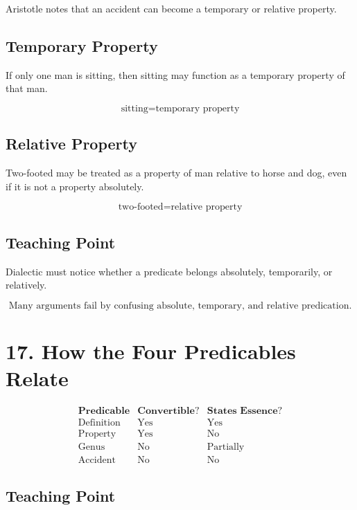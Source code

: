 \documentclass[12pt]{article}
\begin{document}
Aristotle notes that an accident can become a temporary or relative property.

\subsection*{Temporary Property}

If only one man is sitting, then sitting may function as a temporary property of
that man.

\[
\text{sitting} = \text{temporary property}
\]

\subsection*{Relative Property}

Two-footed may be treated as a property of man relative to horse and dog, even
if it is not a property absolutely.

\[
\text{two-footed} = \text{relative property}
\]

\subsection*{Teaching Point}

Dialectic must notice whether a predicate belongs absolutely, temporarily, or
relatively.

\[
\boxed{
\text{Many arguments fail by confusing absolute, temporary, and relative predication.}
}
\]

\section*{17. How the Four Predicables Relate}

\[
\begin{array}{c|c|c}
\textbf{Predicable} & \textbf{Convertible?} & \textbf{States Essence?} \\
\hline
\text{Definition} & \text{Yes} & \text{Yes} \\
\text{Property} & \text{Yes} & \text{No} \\
\text{Genus} & \text{No} & \text{Partially} \\
\text{Accident} & \text{No} & \text{No}
\end{array}
\]

\subsection*{Teaching Point}
\end{document}
